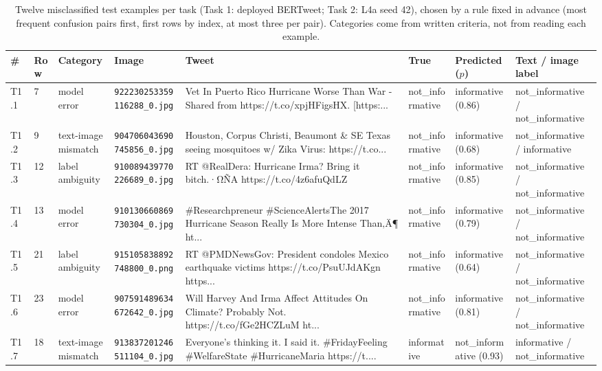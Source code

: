 \begin{table}[t]
\centering
\scriptsize
\caption{Twelve misclassified test examples per task (Task 1: deployed BERTweet; Task 2: L4a seed 42), chosen by a rule fixed in advance (most frequent confusion pairs first, first rows by index, at most three per pair). Categories come from written criteria, not from reading each example.}
\label{tab:errors}
\begin{tabular}{llllp{4.4cm}p{2.1cm}p{2.5cm}p{2.3cm}}
\toprule
\# & Row & Category & Image & Tweet & True & Predicted ($p$) & Text / image label \\
\midrule
T1.1 & 7 & model error & \texttt{922230253359116288\_0.jpg} & Vet In Puerto Rico Hurricane Worse Than War - Shared from https://t.co/xpjHFigsHX. [https:... & not\_informative & informative (0.86) & not\_informative / not\_informative \\
T1.2 & 9 & text-image mismatch & \texttt{904706043690745856\_0.jpg} & Houston, Corpus Christi, Beaumont \& SE Texas seeing mosquitoes w/ Zika Virus: https://t.co... & not\_informative & informative (0.68) & not\_informative / informative \\
T1.3 & 12 & label ambiguity & \texttt{910089439770226689\_0.jpg} & RT @RealDera: Hurricane Irma? Bring it bitch.·ΩÑA https://t.co/4z6afuQdLZ & not\_informative & informative (0.85) & not\_informative / not\_informative \\
T1.4 & 13 & model error & \texttt{910130660869730304\_0.jpg} & \#Researchpreneur \#ScienceAlertsThe 2017 Hurricane Season Really Is More Intense Than‚Ä¶ ht... & not\_informative & informative (0.79) & not\_informative / not\_informative \\
T1.5 & 21 & label ambiguity & \texttt{915105838892748800\_0.png} & RT @PMDNewsGov: President condoles Mexico earthquake victims https://t.co/PsuUJdAKgn https... & not\_informative & informative (0.64) & not\_informative / not\_informative \\
T1.6 & 23 & model error & \texttt{907591489634672642\_0.jpg} & Will Harvey And Irma Affect Attitudes On Climate? Probably Not. https://t.co/fGe2HCZLuM ht... & not\_informative & informative (0.81) & not\_informative / not\_informative \\
T1.7 & 18 & text-image mismatch & \texttt{913837201246511104\_0.jpg} & Everyone's thinking it. I said it. \#FridayFeeling \#WelfareState \#HurricaneMaria https://t.... & informative & not\_informative (0.93) & informative / not\_informative \\

\end{tabular}
\end{table}
